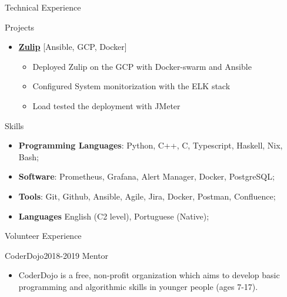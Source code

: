 \documentclass[]{mcdowellcv}
\begin{document}
	\begin{cvsection}{Technical Experience}
		 \begin{cvsubsection}{Projects}{}{}
			\begin{itemize}
				\item \href{https://github.com/alves-luis/sdb-zulip_deployment}{\textbf{Zulip}} [Ansible, GCP, Docker]
                    \begin{itemize}
                        \item Deployed Zulip on the GCP with Docker-swarm and Ansible
                        \item Configured System monitorization with the ELK stack
                        \item Load tested the deployment with JMeter
                        
                    \end{itemize}
			\end{itemize}
		\end{cvsubsection}
	\end{cvsection}

	\begin{cvsection}{Skills}
		\begin{cvsubsection}{}{}{}
			\begin{itemize}
				\item \textbf{Programming Languages}: Python, C++, C, Typescript, Haskell, Nix, Bash;
				\item \textbf{Software}: Prometheus, Grafana, Alert Manager, Docker, PostgreSQL;
				\item \textbf{Tools}: Git, Github, Ansible, Agile, Jira, Docker, Postman, Confluence;
			    \item \textbf{Languages} English (C2 level), Portuguese (Native);
			\end{itemize}
		\end{cvsubsection}
	\end{cvsection}
 	\begin{cvsection}{Volunteer Experience}
		\begin{cvsubsection}{CoderDojo}{}{2018-2019}
            Mentor
			\begin{itemize}
				\item CoderDojo is a free, non-profit organization which aims to develop basic programming and algorithmic skills in younger people (ages 7-17).
			\end{itemize}
		\end{cvsubsection}
	\end{cvsection}
\end{document}
